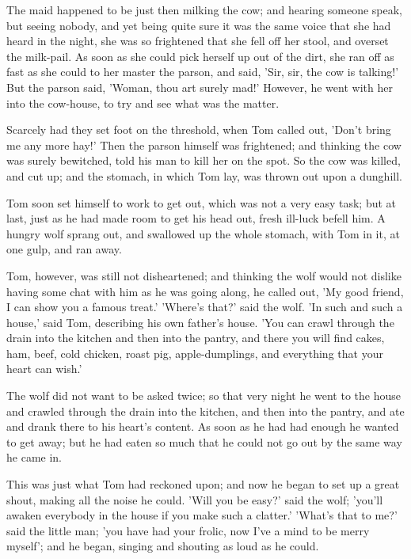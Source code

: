 \documentclass[12pt]{book}
\begin{document}
The maid happened to be just then milking the cow; and hearing someone
speak, but seeing nobody, and yet being quite sure it was the same
voice that she had heard in the night, she was so frightened that she
fell off her stool, and overset the milk-pail. As soon as she could
pick herself up out of the dirt, she ran off as fast as she could to
her master the parson, and said, 'Sir, sir, the cow is talking!' But
the parson said, 'Woman, thou art surely mad!' However, he went with
her into the cow-house, to try and see what was the matter.

Scarcely had they set foot on the threshold, when Tom called out,
'Don't bring me any more hay!' Then the parson himself was frightened;
and thinking the cow was surely bewitched, told his man to kill her on
the spot. So the cow was killed, and cut up; and the stomach, in which
Tom lay, was thrown out upon a dunghill.

Tom soon set himself to work to get out, which was not a very easy
task; but at last, just as he had made room to get his head out, fresh
ill-luck befell him. A hungry wolf sprang out, and swallowed up the
whole stomach, with Tom in it, at one gulp, and ran away.

Tom, however, was still not disheartened; and thinking the wolf would
not dislike having some chat with him as he was going along, he called
out, 'My good friend, I can show you a famous treat.' 'Where's that?'
said the wolf. 'In such and such a house,' said Tom, describing his
own father's house. 'You can crawl through the drain into the kitchen
and then into the pantry, and there you will find cakes, ham, beef,
cold chicken, roast pig, apple-dumplings, and everything that your
heart can wish.'

The wolf did not want to be asked twice; so that very night he went to
the house and crawled through the drain into the kitchen, and then
into the pantry, and ate and drank there to his heart's content. As
soon as he had had enough he wanted to get away; but he had eaten so
much that he could not go out by the same way he came in.

This was just what Tom had reckoned upon; and now he began to set up a
great shout, making all the noise he could. 'Will you be easy?' said
the wolf; 'you'll awaken everybody in the house if you make such a
clatter.' 'What's that to me?' said the little man; 'you have had your
frolic, now I've a mind to be merry myself'; and he began, singing and
shouting as loud as he could.
\end{document}
